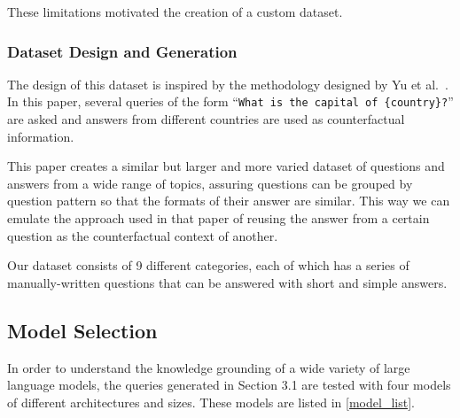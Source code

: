 These limitations motivated the creation of a custom dataset.

\subsubsection{Dataset Design and Generation}

The design of this dataset is inspired by the methodology designed by Yu et al.\ \cite{factual_recall}.
In this paper, several queries of the form ``\texttt{What is the capital of \{country\}?}'' are asked and answers from different countries are used as counterfactual information.

This paper creates a similar but larger and more varied dataset of questions and answers from a wide range of topics, assuring questions can be grouped by question pattern so that the formats of their answer are similar.
This way we can emulate the approach used in that paper of reusing the answer from a certain question as the counterfactual context of another.

Our dataset consists of 9 different categories, each of which has a series of manually-written questions that can be answered with short and simple answers.

\subsection{Model Selection}
\label{model_selection}

In order to understand the knowledge grounding of a wide variety of large language
models, the queries generated in Section 3.1 are tested with four models of different
architectures and sizes.
These models are listed in \cref{model_list}.


